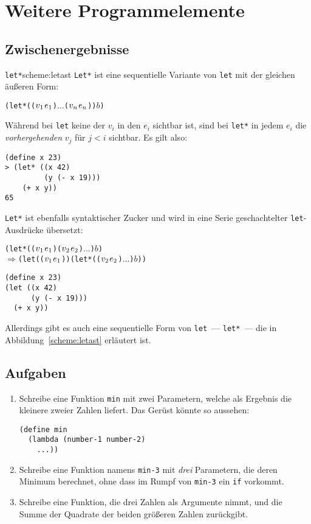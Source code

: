 \chapter{Weitere Programmelemente}
\label{cha:elements}

\section{Zwischenergebnisse}

\begin{feature}{\texttt{let*}}{scheme:letast}
\texttt{Let*} ist eine sequentielle
Variante von \texttt{let} mit der gleichen äußeren Form:
%
\begin{alltt}
(let* ((\(v\sb{1}\) \(e\sb{1}\)) \(\ldots\) (\(v\sb{n}\) \(e\sb{n}\))) \(b\))
\end{alltt}
%
Während bei \texttt{let} keine der $v_i$ in den $e_i$ sichtbar ist,
sind bei \texttt{let*} in jedem $e_i$ die \emph{vorhergehenden} $v_j$
für $j<i$ sichtbar.  Es gilt also:
%
\begin{verbatim}
(define x 23)
> (let* ((x 42)
         (y (- x 19)))
    (+ x y))
65
\end{verbatim}
%
\texttt{Let*} ist ebenfalls syntaktischer Zucker und wird in eine
Serie geschachtelter \texttt{let}-Ausdrücke übersetzt:
%
\begin{alltt}
(let* ((\(v\sb{1}\) \(e\sb{1}\)) (\(v\sb{2}\) \(e\sb{2}\)) \(\ldots\)) \(b\))
\(\Longrightarrow\) (let ((\(v\sb{1}\) \(e\sb{1}\))) (let* ((\(v\sb{2}\) \(e\sb{2}\)) \(\ldots\)) \(b\)))
\end{alltt}
\end{feature}
%
\begin{verbatim}
(define x 23)
(let ((x 42)
      (y (- x 19)))
  (+ x y))
\end{verbatim}
%
Allerdings gibt es auch eine sequentielle Form von \texttt{let}~---
\texttt{let*}~--- die in Abbildung~\ref{scheme:letast} erläutert ist.
\section*{Aufgaben}

\begin{aufgabe}
\begin{enumerate}\item
  Schreibe eine Funktion \texttt{min} mit zwei Parametern, welche als
  Ergebnis die kleinere zweier Zahlen liefert.  Das Gerüst könnte so
  aussehen:
\begin{verbatim}
(define min
  (lambda (number-1 number-2)
    ...))
\end{verbatim}
\item Schreibe eine Funktion namens \texttt{min-3} mit \emph{drei}
  Parametern, die deren Minimum berechnet, ohne dass im Rumpf von
  \texttt{min-3} ein \texttt{if} vorkommt.
\item
  Schreibe eine Funktion, die drei Zahlen als Argumente nimmt, und die
  Summe der Quadrate der beiden größeren Zahlen zurückgibt.
\end{enumerate}
\end{aufgabe}

